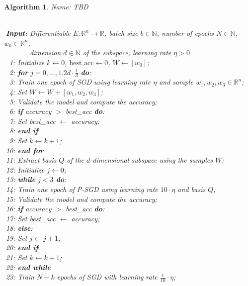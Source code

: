 \documentclass[11pt, a4paper]{article}
\newtheorem{algorithm}[theorem]{Algorithm}
\newcommand{\N}{\mathbb{N}}
\newcommand{\R}{\mathbb{R}}
\begin{document}
\begin{algorithm}
\caption{Name: TBD \textcolor{white}{$\Big |$}} \ \\
\textcolor{white}{$\Big |$}\textbf{Input:} Differentiable $E: \R^n \to \R$, batch size $b \in \N$, number of epochs $N \in \N$, $w_0 \in \R^n$, \\
\textcolor{white}{$\Big |$\textbf{Input:}} dimension $d \in \N$ of the subspace, learning rate $\eta > 0$ \\
\textcolor{white}{$\Big |0$}1: Initialize $k \leftarrow 0$, $\text{best\_acc} \leftarrow 0$, $W \leftarrow [w_0]$; \\
\textcolor{white}{$\Big |0$}2: \textbf{for} $j=0, \dots, 1.2d \cdot \frac{1}{3}$ \textbf{do}: \\
\textcolor{white}{$\Big |0$}3: \quad Train one epoch of SGD using learning rate $\eta$ and sample $w_1, w_2, w_3 \in \R^n$; \\
\textcolor{white}{$\Big |0$}4: \quad Set $W \leftarrow W + [w_1, w_2, w_3]$; \\
\textcolor{white}{$\Big |0$}5: \quad Validate the model and compute the accuracy; \\
\textcolor{white}{$\Big |0$}6: \quad \textbf{if} accuracy $>$ best\_acc \textbf{do}: \\
\textcolor{white}{$\Big |0$}7: \quad \quad Set best\_acc $\leftarrow$ accuracy; \\
\textcolor{white}{$\Big |0$}8: \quad \textbf{end if} \\
\textcolor{white}{$\Big |0$}9: \quad Set $k \leftarrow k+1$; \\
\textcolor{white}{$\Big |$}10: \textbf{end for} \\
\textcolor{white}{$\Big |$}11: Extract basis $Q$ of the $d$-dimensional subspace using the samples $W$; \\
\textcolor{white}{$\Big |$}12: Initialize $j \leftarrow 0$; \\
\textcolor{white}{$\Big |$}13: \textbf{while} $j<3$ \textbf{do}: \\
\textcolor{white}{$\Big |$}14: \quad Train one epoch of P-SGD using learning rate $10\cdot\eta$ and basis $Q$; \\
\textcolor{white}{$\Big |$}15: \quad Validate the model and compute the accuracy; \\
\textcolor{white}{$\Big |$}16: \quad \textbf{if} accuracy $>$ best\_acc \textbf{do}: \\
\textcolor{white}{$\Big |$}17: \quad \quad Set best\_acc $\leftarrow$ accuracy; \\
\textcolor{white}{$\Big |$}18: \quad \textbf{else}: \\
\textcolor{white}{$\Big |$}19: \quad \quad Set $j \leftarrow j +1$; \\
\textcolor{white}{$\Big |$}20: \quad \textbf{end if} \\
\textcolor{white}{$\Big |$}21: \quad Set $k \leftarrow k+1$; \\
\textcolor{white}{$\Big |$}22: \textbf{end while} \\
\textcolor{white}{$\Big |$}23: Train $N-k$ epochs of SGD with learning rate $\frac{1}{10}\cdot \eta$; \\
\end{algorithm}
\end{document}
